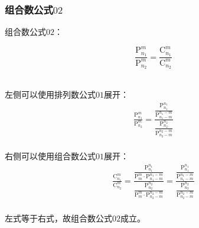 \documentclass[UTF8]{ctexart}
\begin{document}
\newpage

\subsubsection{组合数公式$02$}
    组合数公式$02$：
    \begin{large}
        \begin{equation*}
            \frac{\mathrm{P}_{n_1}^m}{\mathrm{P}_{n_2}^m}=\frac{\mathrm{C}_{n_1}^m}{\mathrm{C}_{n_2}^m}
        \end{equation*}
    \end{large}\\
    左侧可以使用排列数公式$01$展开：
    \setcounter{equation}{0}
    \begin{align}
        \frac{\mathrm{P}_{n_1}^m}{\mathrm{P}_{n_2}^m}=\frac{\dfrac{\mathrm{P}_{n_1}^{n_1}}{\mathrm{P}_{n_1-m}^{n_1-m}}}{\dfrac{\mathrm{P}_{n_2}^{n_2}}{\mathrm{P}_{n_2-m}^{n_2-m}}}
    \end{align}\\
    右侧可以使用组合数公式$01$展开：
    \begin{align}
        \frac{\mathrm{C}_{n_1}^m}{\mathrm{C}_{n_2}^m}=\frac{\dfrac{\mathrm{P}_{n_1}^{n_1}}{\mathrm{P}_m^m\cdot\mathrm{P}_{n_1-m}^{n_1-m}}}{\dfrac{\mathrm{P}_{n_2}^{n_2}}{\mathrm{P}_m^m\cdot\mathrm{P}_{n_2-m}^{n_2-m}}}=\frac{\dfrac{\mathrm{P}_{n_1}^{n_1}}{\mathrm{P}_{n_1-m}^{n_1-m}}}{\dfrac{\mathrm{P}_{n_2}^{n_2}}{\mathrm{P}_{n_2-m}^{n_2-m}}}
    \end{align}\\
    左式等于右式，故组合数公式$02$成立。

\newpage
\end{document}
